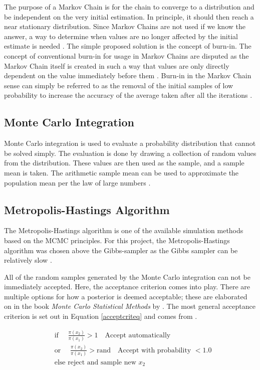 	The purpose of a Markov Chain is for the chain to converge to a distribution and be independent on the very initial estimation. 
	In principle, it should then reach a near stationary distribution.
	Since Markov Chains are not used if we know the answer, a way to determine when values are no longer affected by the initial estimate is needed \cite{Gilks:1996}. 
	The simple proposed solution is the concept of burn-in. 
	The concept of conventional burn-in for usage in Markov Chains are disputed as the Markov Chain itself is created in such a way that values are only directly dependent on the value immediately before them \cite{Meyn:1993}.
	Burn-in in the Markov Chain sense can simply be referred to as the removal of the initial samples of low probability to increase the accuracy of the average taken after all the iterations \cite{John:2016}.
		
	\subsection{Monte Carlo Integration}\label{MCint_sec}
	Monte Carlo integration is used to evaluate a probability distribution that cannot be solved simply. 
	The evaluation is done by drawing a collection of random values from the distribution.
	These values are then used as the sample, and a sample mean is taken.
	The arithmetic sample mean can be used to approximate the population mean per the law of large numbers \citep{Gilks:1996}.
	

\subsection{Metropolis-Hastings Algorithm}

The Metropolis-Hastings algorithm is one of the available simulation methods based on the MCMC principles. 
For this project, the Metropolis-Hastings algorithm was chosen above the Gibbs-sampler as the Gibbs sampler can be relatively slow \cite{Murphy:2012}.

All of the random samples generated by the Monte Carlo integration can not be immediately accepted.
	Here, the acceptance criterion comes into play.
	There are multiple options for how a posterior is deemed acceptable; these are elaborated on in the book  \textit{Monte Carlo Statistical Methods} by \citeauthor{Robert:2004}. 
	The most general acceptance criterion is set out in Equation \ref{acceptcriteq} and comes from \citet{Kaipo:2005}.
	
		\begin{equation} \label{acceptcriteq}
		\begin{aligned}
		&\text{if  }\quad \frac{\pi (x_2)}{\pi(x_1)} > 1 \quad \text{Accept automatically}\\
		&\text{or  }\quad \frac{\pi (x_2)}{\pi(x_1)} > \text{rand}  \quad \text{Accept with probability }< 1.0\\
		&\text{else reject and sample new } x_2
		\end{aligned}
		\end{equation}

